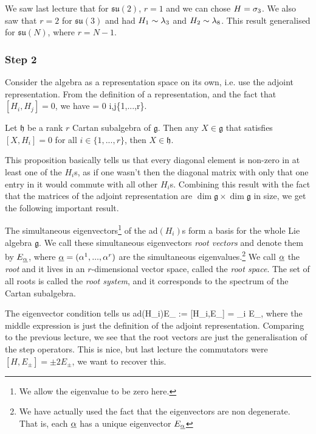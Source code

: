 \bex 
    We saw last lecture that for $\mathfrak{su}(2)$, $r=1$ and we can chose $H=\sigma_3$. We also saw that $r=2$ for $\mathfrak{su}(3)$ and had $H_1\sim \lambda_3$ and $H_2 \sim \lambda_8$. This result generalised for $\mathfrak{su}(N)$, where $r=N-1$.
\eex 

\subsubsection{Step 2}

Consider the algebra as a representation space on its own, i.e. use the adjoint representation. From the definition of a representation, and the fact that $[H_i,H_j]=0$, we have 
\bse 
    [ad(H_i),ad(H_j)] = 0 \qquad \forall i,j\in\{1,...,r\}.
\ese 

\bp 
    Let $\mathfrak{h}$ be a rank $r$ Cartan subalgebra of $\mathfrak{g}$. Then any $X\in\mathfrak{g}$ that satisfies $[X,H_i]=0$ for all $i\in\{1,...,r\}$, then $X\in\mathfrak{h}$.
\ep 

This proposition basically tells us that every diagonal element is non-zero in at least one of the $H_i$s, as if one wasn't then the diagonal matrix with only that one entry in it would commute with all other $H_i$s. Combining this result with the fact that the matrices of the adjoint representation are $\dim\mathfrak{g}\times \dim\mathfrak{g}$ in size, we get the following important result. 

\bc 
    The simultaneous eigenvectors\footnote{We allow the eigenvalue to be zero here.} of the ad$(H_i)$s form a basis for the whole Lie algebra $\mathfrak{g}$. 
\ec 
We call these simultaneous eigenvectors \textit{root vectors} and denote them by $E_{\underline{\alpha}}$, where $\underline{\alpha} = (\alpha^1,...,\alpha^r)$ are the simultaneous eigenvalues.\footnote{We have actually used the fact that the eigenvectors are non degenerate. That is, each $\underline{\alpha}$ has a unique eigenvector $E_{\underline{\alpha}}$} We call $\underline{\alpha}$ the \textit{root} and it lives in an $r$-dimensional vector space, called the \textit{root space}. The set of all roots is called the \textit{root system}, and it corresponds to the spectrum of the Cartan subalgebra.

The eigenvector condition tells us 
\be
\label{eqn:AdHEigenvectors}
    ad(H_i)E_{\underline{\a}} := [H_i,E_{\underline{\a}}] = \a_i E_{\underline{\a}},
\ee 
where the middle expression is just the definition of the adjoint representation. Comparing to the previous lecture, we see that the root vectors are just the generalisation of the step operators. This is nice, but last lecture the commutators were $[H,E_{\pm}]=\pm 2E_{\pm}$, we want to recover this.

